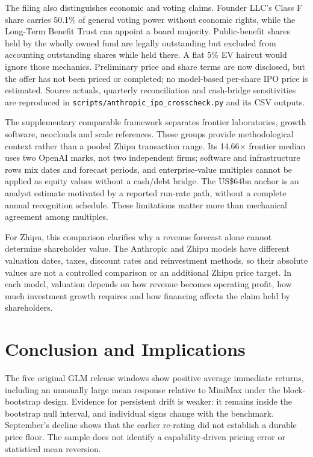 \documentclass[11pt]{article}
\begin{document}
The filing also distinguishes economic and voting claims. Founder LLC's Class F share carries 50.1\% of general voting power without economic rights, while the Long-Term Benefit Trust can appoint a board majority. Public-benefit shares held by the wholly owned fund are legally outstanding but excluded from accounting outstanding shares while held there. A flat 5\% EV haircut would ignore those mechanics. Preliminary price and share terms are now disclosed, but the offer has not been priced or completed; no model-based per-share IPO price is estimated. Source actuals, quarterly reconciliation and cash-bridge sensitivities are reproduced in \texttt{scripts/anthropic\_ipo\_crosscheck.py} and its CSV outputs.

The supplementary comparable framework separates frontier laboratories, growth software, neoclouds and scale references. These groups provide methodological context rather than a pooled Zhipu transaction range. Its 14.66$\times$ frontier median uses two OpenAI marks, not two independent firms; software and infrastructure rows mix dates and forecast periods, and enterprise-value multiples cannot be applied as equity values without a cash/debt bridge. The US\$64bn anchor is an analyst estimate motivated by a reported run-rate path, without a complete annual recognition schedule. These limitations matter more than mechanical agreement among multiples.

For Zhipu, this comparison clarifies why a revenue forecast alone cannot determine shareholder value. The Anthropic and Zhipu models have different valuation dates, taxes, discount rates and reinvestment methods, so their absolute values are not a controlled comparison or an additional Zhipu price target. In each model, valuation depends on how revenue becomes operating profit, how much investment growth requires and how financing affects the claim held by shareholders.

\clearpage
\section{Conclusion and Implications}
The five original GLM release windows show positive average immediate returns, including an unusually large mean response relative to MiniMax under the block-bootstrap design. Evidence for persistent drift is weaker: it remains inside the bootstrap null interval, and individual signs change with the benchmark. September's decline shows that the earlier re-rating did not establish a durable price floor. The sample does not identify a capability-driven pricing error or statistical mean reversion.
\end{document}
